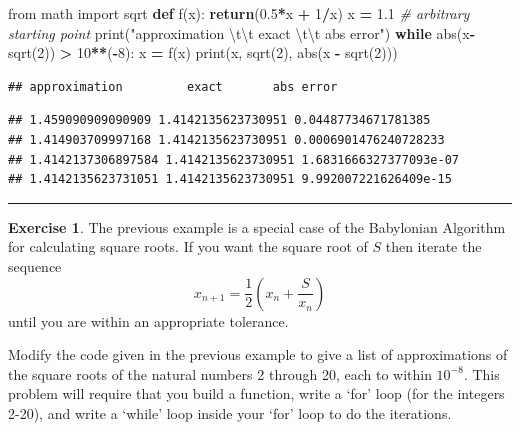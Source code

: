 \documentclass[
]{book}
\newenvironment{Shaded}{\begin{snugshade}}{\end{snugshade}}
\newcommand{\BuiltInTok}[1]{#1}
\newcommand{\CharTok}[1]{\textcolor[rgb]{0.31,0.60,0.02}{#1}}
\newcommand{\CommentTok}[1]{\textcolor[rgb]{0.56,0.35,0.01}{\textit{#1}}}
\newcommand{\ControlFlowTok}[1]{\textcolor[rgb]{0.13,0.29,0.53}{\textbf{#1}}}
\newcommand{\DecValTok}[1]{\textcolor[rgb]{0.00,0.00,0.81}{#1}}
\newcommand{\FloatTok}[1]{\textcolor[rgb]{0.00,0.00,0.81}{#1}}
\newcommand{\ImportTok}[1]{#1}
\newcommand{\KeywordTok}[1]{\textcolor[rgb]{0.13,0.29,0.53}{\textbf{#1}}}
\newcommand{\NormalTok}[1]{#1}
\newcommand{\OperatorTok}[1]{\textcolor[rgb]{0.81,0.36,0.00}{\textbf{#1}}}
\newcommand{\StringTok}[1]{\textcolor[rgb]{0.31,0.60,0.02}{#1}}
\theoremstyle{definition}
\theoremstyle{definition}
\theoremstyle{definition}
\newtheorem{exercise}{Exercise}[chapter]
\theoremstyle{remark}
\begin{document}
\begin{Shaded}
\begin{Highlighting}[]
\ImportTok{from}\NormalTok{ math }\ImportTok{import}\NormalTok{ sqrt}
\KeywordTok{def}\NormalTok{ f(x):}
    \ControlFlowTok{return}\NormalTok{(}\FloatTok{0.5}\OperatorTok{*}\NormalTok{x }\OperatorTok{+} \DecValTok{1}\OperatorTok{/}\NormalTok{x)}
\NormalTok{x }\OperatorTok{=} \FloatTok{1.1} \CommentTok{\# arbitrary starting point}
\BuiltInTok{print}\NormalTok{(}\StringTok{"approximation }\CharTok{\textbackslash{}t\textbackslash{}t}\StringTok{ exact }\CharTok{\textbackslash{}t\textbackslash{}t}\StringTok{ abs error"}\NormalTok{)}
\ControlFlowTok{while} \BuiltInTok{abs}\NormalTok{(x}\OperatorTok{{-}}\NormalTok{sqrt(}\DecValTok{2}\NormalTok{)) }\OperatorTok{\textgreater{}} \DecValTok{10}\OperatorTok{**}\NormalTok{(}\OperatorTok{{-}}\DecValTok{8}\NormalTok{):}
\NormalTok{    x }\OperatorTok{=}\NormalTok{ f(x)}
    \BuiltInTok{print}\NormalTok{(x, sqrt(}\DecValTok{2}\NormalTok{), }\BuiltInTok{abs}\NormalTok{(x }\OperatorTok{{-}}\NormalTok{ sqrt(}\DecValTok{2}\NormalTok{)))}
\end{Highlighting}
\end{Shaded}

\begin{verbatim}
## approximation         exact       abs error
\end{verbatim}

\begin{verbatim}
## 1.459090909090909 1.4142135623730951 0.04487734671781385
## 1.414903709997168 1.4142135623730951 0.0006901476240728233
## 1.4142137306897584 1.4142135623730951 1.6831666327377093e-07
## 1.4142135623731051 1.4142135623730951 9.992007221626409e-15
\end{verbatim}

\begin{center}\rule{0.5\linewidth}{0.5pt}\end{center}

\begin{exercise}
\protect\hypertarget{exr:babylonian-sqrt}{}{\label{exr:babylonian-sqrt} }The previous example is a special case of the Babylonian Algorithm for calculating square roots. If you want the square root of \(S\) then iterate the sequence \[x_{n+1} = \frac{1}{2} \left( x_n + \frac{S}{x_n} \right)\] until you are within an appropriate tolerance.

Modify the code given in the previous example to give a list of approximations of the square roots of the natural numbers 2 through 20, each to within \(10^{-8}\). This problem will require that you build a function, write a `for' loop (for the integers 2-20), and write a `while' loop inside your `for' loop to do the iterations.
\end{exercise}
\end{document}
